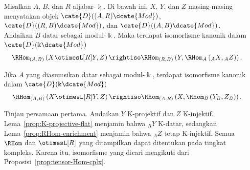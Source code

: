 \begin{teorema}\label{prop:RHom-otimesL-adjunction}
	Misalkan $A$, $B$, dan $R$ aljabar-$\Bbbk$. Di bawah ini, $X$, $Y$, dan
	$Z$ masing-masing menyatakan objek
	$\cate{D}((A,R)\dcate{Mod})$, $\cate{D}((R,B)\dcate{Mod})$, dan
	$\cate{D}((A,B)\dcate{Mod})$. Andaikan $B$ datar sebagai
	modul-$\Bbbk$. Maka terdapat isomorfisme kanonik dalam
	$\cate{D}(\Bbbk\dcate{Mod})$
	\begin{equation*}
		\RHom_{(A,B)} \left( X \otimesL[R] Y, Z \right) \rightiso \RHom_{(R,B)}\left( Y, \RHom_A \left( {}_A X, {}_A Z \right) \right).
	\end{equation*}

	Jika $A$ yang diasumsikan datar sebagai modul-$\Bbbk$, terdapat
	isomorfisme kanonik dalam $\cate{D}(\Bbbk\dcate{Mod})$
	\begin{equation*}
		\RHom_{(A,B)}\left( X \otimesL[R] Y, Z \right) \rightiso \RHom_{(A,R)}\left( X, \RHom_B\left( Y_B , Z_B \right) \right).
	\end{equation*}
\end{teorema}
\begin{bukti}
	Tinjau persamaan pertama. Andaikan $Y$ K-projektif dan $Z$ K-injektif.
	Lema~\ref{prop:K-projective-flat} menjamin bahwa ${}_R Y$ K-datar,
	sedangkan Lema~\ref{prop:RHom-enrichment} menjamin bahwa ${}_A Z$ tetap
	K-injektif. Semua $\RHom$ dan $\otimesL[R]$ yang ditampilkan dapat
	ditentukan pada tingkat kompleks. Karena itu, isomorfisme yang dicari
	mengikuti dari Proposisi~\ref{prop:tensor-Hom-cplx}.
\end{bukti}

